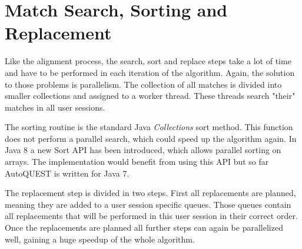 \section{Match Search, Sorting and Replacement}
Like the alignment process, the search, sort and replace steps take a lot of time and have to be performed in each iteration of the algorithm.
Again, the solution to those problems is parallelism. The collection of all matches is divided into smaller collections and assigned to a worker thread. These threads
search "their" matches in all user sessions.

The sorting routine is the standard Java \textit{Collections} sort method. This function does not perform a parallel search, which could speed up the algorithm again.
In Java 8 a new Sort API has been introduced, which allows parallel sorting on arrays. The implementation would  benefit from using this API but so far AutoQUEST is written for Java 7.

The replacement step is divided in two steps. First all replacements are planned, meaning they are added to a user session specific queues.
Those queues contain all replacements that will be performed in this user session in their correct order.
Once the replacements are planned all further steps can again be parallelized well, gaining a huge speedup of the whole algorithm.
